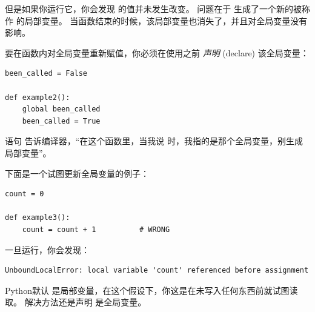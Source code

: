 但是如果你运行它，你会发现  的值并未发生改变。
问题在于  生成了一个新的被称作  的局部变量。
当函数结束的时候，该局部变量也消失了，并且对全局变量没有影响。

  


要在函数内对全局变量重新赋值，你必须在使用之前 {\em 声明} (declare) 该全局变量：

\begin{lstlisting}
been_called = False

def example2():
    global been_called
    been_called = True
\end{lstlisting}

%

 语句 告诉编译器，``在这个函数里，当我说  时，我指的是那个全局变量，别生成局部变量''。

  


下面是一个试图更新全局变量的例子：

\begin{lstlisting}
count = 0

def example3():
    count = count + 1          # WRONG
\end{lstlisting}

%

一旦运行，你会发现：

  

\begin{lstlisting}
UnboundLocalError: local variable 'count' referenced before assignment
\end{lstlisting}

%

Python默认  是局部变量，在这个假设下，你这是在未写入任何东西前就试图读取。
解决方法还是声明  是全局变量。

